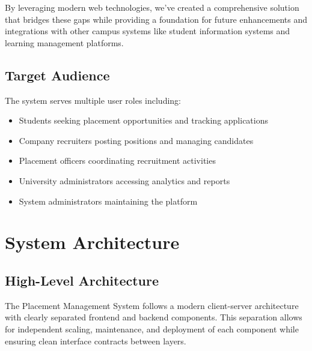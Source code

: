 \documentclass[12pt,a4paper]{article}
\begin{document}
By leveraging modern web technologies, we've created a comprehensive solution that bridges these gaps while providing a foundation for future enhancements and integrations with other campus systems like student information systems and learning management platforms.

\subsection{Target Audience}
The system serves multiple user roles including:
\begin{itemize}
    \item Students seeking placement opportunities and tracking applications
    \item Company recruiters posting positions and managing candidates
    \item Placement officers coordinating recruitment activities
    \item University administrators accessing analytics and reports
    \item System administrators maintaining the platform
\end{itemize}

\section{System Architecture}

\subsection{High-Level Architecture}
The Placement Management System follows a modern client-server architecture with clearly separated frontend and backend components. This separation allows for independent scaling, maintenance, and deployment of each component while ensuring clean interface contracts between layers.
\end{document}
